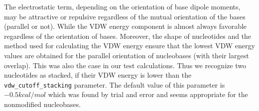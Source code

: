 \documentclass[12pt]{article}
\begin{document}
The electrostatic term, depending on the orientation of base dipole moments, may be attractive or repulsive regardless of the mutual orientation of the bases (parallel or not). While the VDW energy component is almost always favorable regardless of the orientation of bases. Moreover, the shape of nucleotides and the method used for calculating the VDW energy ensure that the lowest VDW energy values are obtained for the parallel orientation of nucleobases (with their largest overlap). This was also the case in our test calculations. Thus we recognize two nucleotides as stacked, if their VDW energy is lower than the {\tt vdw\_cutoff\_stacking} parameter. The default value of this parameter is $ -0.5 kcal/mol$ which was found by trial and error and seems appropriate for the nonmodified nucleobases.

\end{document}
